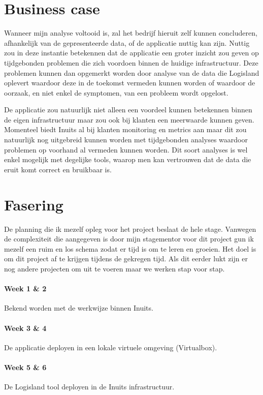 \documentclass[a4paper]{article}
\begin{document}
\section{Business case}
Wanneer mijn analyse voltooid is, zal het bedrijf hieruit zelf kunnen concluderen, afhankelijk van de gepresenteerde data, of de applicatie nuttig kan zijn. 
Nuttig zou in deze instantie betekennen dat de applicatie een groter inzicht zou geven op tijdgebonden problemen die zich voordoen binnen de huidige infrastructuur.
Deze problemen kunnen dan opgemerkt worden door analyse van de data die Logisland oplevert waardoor deze in de toekomst vermeden kunnen worden of waardoor de oorzaak, en niet enkel de symptomen, van een probleem wordt opgelost.
\par
De applicatie zou natuurlijk niet alleen een voordeel kunnen betekennen binnen de eigen infrastructuur maar zou ook bij klanten een meerwaarde kunnen geven. 
Momenteel biedt Inuits al bij klanten monitoring en metrics aan maar dit zou natuurlijk nog uitgebreid kunnen worden met tijdgebonden analyses waardoor problemen op voorhand al vermeden kunnen worden.
Dit soort analyses is wel enkel mogelijk met degelijke tools, waarop men kan vertrouwen dat de data die eruit komt correct en bruikbaar is.

\newpage{}
\section{Fasering}
De planning die ik mezelf opleg voor het project beslaat de hele stage.
Vanwegen de complexiteit die aangegeven is door mijn stagementor voor dit project gun ik mezelf een ruim en los schema zodat er tijd is om te leren en groeien.
Het doel is om dit project af te krijgen tijdens de gekregen tijd. Als dit eerder lukt zijn er nog andere projecten om uit te voeren maar we werken stap voor stap.
\par
\paragraph{Week 1 \& 2} Bekend worden met de werkwijze binnen Inuits.
\paragraph{Week 3 \& 4} De applicatie deployen in een lokale virtuele omgeving (Virtualbox).
\paragraph{Week 5 \& 6} De Logisland tool deployen in de Inuits infrastructuur.
\end{document}
